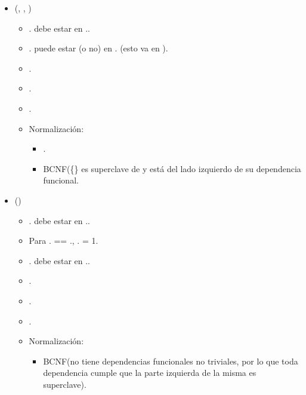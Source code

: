 \begin{itemize}
        \item {}(, , 
            )
            \begin{itemize}
                \item {}. debe estar en 
                    ..
                \item {}. puede estar (o no) en 
                    . (esto va en ).
                \item {}.
                \item {}.
                \item {}.
                \item Normalización:
                    \begin{itemize}
                        \item {}.
                        \item BCNF(\{\} es superclave de 
                             y está del lado izquierdo de su 
                            dependencia funcional.
                    \end{itemize}
            \end{itemize}


        \item {}()
            \begin{itemize}
                \item {}. debe estar en 
                    ..
                \item Para . == 
                    ., 
                    . = 1.
                \item {}. debe estar en 
                    ..
                \item {}.
                \item {}.
                \item {}.
                \item Normalización:
                    \begin{itemize}
                        \item BCNF(no tiene dependencias funcionales no 
                            triviales, por lo que toda dependencia cumple que
                            la parte izquierda de la misma es superclave).
                    \end{itemize}
            \end{itemize}


\end{itemize}
